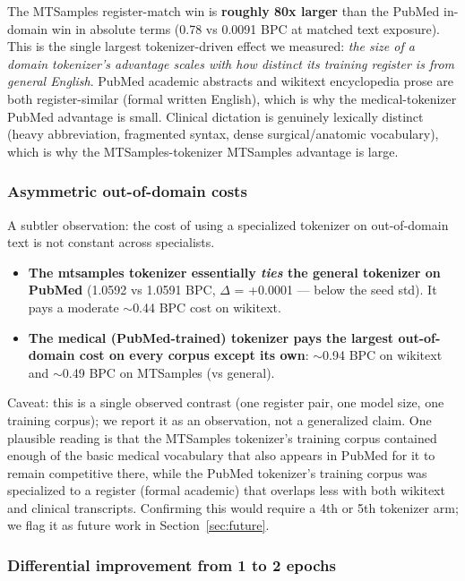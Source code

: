 \documentclass[11pt]{article}
\begin{document}
The MTSamples register-match win is \textbf{roughly 80x larger} than the PubMed in-domain win in absolute terms (0.78 vs 0.0091 BPC at matched text exposure). This is the single largest tokenizer-driven effect we measured: \emph{the size of a domain tokenizer's advantage scales with how distinct its training register is from general English}. PubMed academic abstracts and wikitext encyclopedia prose are both register-similar (formal written English), which is why the medical-tokenizer PubMed advantage is small. Clinical dictation is genuinely lexically distinct (heavy abbreviation, fragmented syntax, dense surgical/anatomic vocabulary), which is why the MTSamples-tokenizer MTSamples advantage is large.

\subsubsection{Asymmetric out-of-domain costs}

A subtler observation: the cost of using a specialized tokenizer on out-of-domain text is not constant across specialists.

\begin{itemize}[leftmargin=*, itemsep=0pt]
    \item \textbf{The mtsamples tokenizer essentially \emph{ties} the general tokenizer on PubMed} (1.0592 vs 1.0591 BPC, $\Delta$ = +0.0001 --- below the seed std). It pays a moderate $\sim$0.44 BPC cost on wikitext.
    \item \textbf{The medical (PubMed-trained) tokenizer pays the largest out-of-domain cost on every corpus except its own}: $\sim$0.94 BPC on wikitext and $\sim$0.49 BPC on MTSamples (vs general).
\end{itemize}

Caveat: this is a single observed contrast (one register pair, one model size, one training corpus); we report it as an observation, not a generalized claim. One plausible reading is that the MTSamples tokenizer's training corpus contained enough of the basic medical vocabulary that also appears in PubMed for it to remain competitive there, while the PubMed tokenizer's training corpus was specialized to a register (formal academic) that overlaps less with both wikitext and clinical transcripts. Confirming this would require a 4th or 5th tokenizer arm; we flag it as future work in Section~\ref{sec:future}.

\subsubsection{Differential improvement from 1 to 2 epochs}
\end{document}
